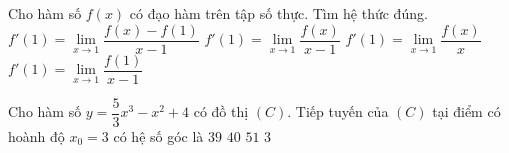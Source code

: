 \begin{ex}%
	Cho hàm số $ f\left( x  \right) $ có đạo hàm trên tập số thực. Tìm hệ thức đúng.
	 \choice
		{\True $ f'\left( {1} \right) = \mathop {\lim }\limits_{x \to 1}  \dfrac{{f\left( x \right) - f\left( 1 \right)}}{{x - 1}}$}
		 {$ f'\left( {1} \right) = \mathop {\lim }\limits_{x \to 1} \dfrac{{f\left( x \right) }}{{x - 1}}$}
		{$ f'\left( {1} \right) = \mathop {\lim }\limits_{x \to 1} \dfrac{{f\left(  x \right)}}{{x}}$}
		{$ f'\left( {1} \right) = \mathop {\lim }\limits_{x  \to 1} \dfrac{{f\left( 1 \right)}}{{x - 1}}$}
\end{ex}

\begin{ex}%
	Cho hàm số $y=\dfrac{5}{3}{x^3}-x^2+4$ có đồ thị  $(C)$. Tiếp tuyến của $(C)$ tại điểm có hoành độ $x_0=3$ có hệ số góc là
	\choice 
		 {\True $39$}
		 {$40$}
		 {$51$}
		 {$3$}
\end{ex}

